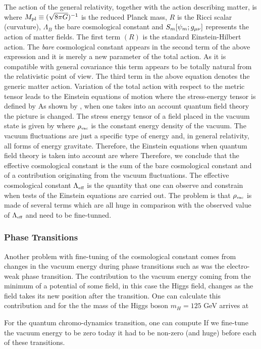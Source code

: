 The action of the general relativity, together with the action describing matter, is
where $M_{\text{\scriptsize pl}}\equiv(\sqrt{8\pi G})^{-1}$ is the reduced Planck mass, $R$ is the Ricci scalar (curvature), $\Lambda_B$ the bare cosmological constant and $S_m[\psi_m;g_{\mu\nu}]$ represents the action of matter fields. The first term $(R)$ is the standard Einstein-Hilbert action. The \textit{bare} cosmological constant appears in the second term of the above expression and it is merely a new parameter of the total action. As it is compatible with general covariance this term appears to be totally natural from the relativistic point of view. The third term in the above equation denotes the generic matter action. Variation of the total action with respect to the metric tensor leads to the Einstein equations of motion
where the stress-energy tensor is defined by
As shown by \textcite{1968SPhD...12.1040S}, when one takes into an account quantum field theory the picture is changed. The stress energy tensor of a field placed in the vacuum state is given by
where $\rho_\text{\tiny vac}$ is the constant energy density of the vacuum. The vacuum fluctuations are just a specific type of energy and, in general relativity, all forms of energy gravitate. Therefore, the Einstein equations when quantum field theory is taken into account are
where
Therefore, we conclude that the effective cosmological constant is the sum of the bare cosmological constant and of a contribution originating from the vacuum fluctuations. The effective cosmological constant $\Lambda_\text{\tiny eff}$ is the quantity that one can observe and constrain when tests of the Einstein equations are carried out. The problem is that $\rho_\text{\tiny vac}$ is made of several terms which are all huge in comparison with the observed value of $\Lambda_\text{\tiny eff}$ and need to be fine-tunned.
\subsubsection{Phase Transitions}
\begin{sloppypar}
Another problem with fine-tuning of the cosmological constant comes from changes in the vacuum energy during phase transitions such as was the electro-weak phase transition. The contribution to the vacuum energy coming from the minimum of a potential of some field, in this case the Higgs field, changes as the field takes its new position after the transition. One can calculate this contribution \parencite{2012CRPhy..13..566M} and for the the mass of the Higgs boson $m_H=125$ GeV arrives at
\end{sloppypar}
For the quantum chromo-dynamics transition, one can compute
If we fine-tune the vacuum energy to be zero today it had to be non-zero (and huge) before each of these transitions.
